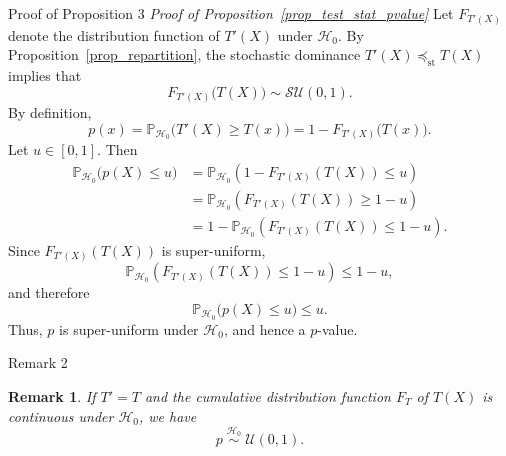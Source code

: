 \documentclass{beamer}
\newtheorem{remark}{Remark}
\begin{document}
\begin{frame}[allowframebreaks]{Proof of Proposition 3}
  \textit{Proof of Proposition~\ref{prop_test_stat_pvalue}}
    Let \(F_{T'(X)}\) denote the distribution function of \(T'(X)\) under $\mathcal{H}_0$.
    By Proposition~\ref{prop_repartition}, the stochastic dominance
    \(T'(X) \preceq_{\mathrm{st}} T(X)\) implies that
    \begin{equation*}
      F_{T'(X)}\bigl(T(X)\bigr) \sim \mathcal{SU}(0,1).
    \end{equation*}
    By definition,
    \begin{equation*}
      p(x) = \mathbb{P}_{\mathcal{H}_0}\!\bigl(T'(X) \ge T(x)\bigr)
           = 1 - F_{T'(X)}\bigl(T(x)\bigr).
    \end{equation*}
    Let \(u \in [0,1]\). Then
    \begin{align*}
      \mathbb{P}_{\mathcal{H}_0}\bigl(p(X) \le u\bigr)
      &= \mathbb{P}_{\mathcal{H}_0}\!\left(1 - F_{T'(X)}(T(X)) \le u\right) \\
      &= \mathbb{P}_{\mathcal{H}_0}\!\left(F_{T'(X)}(T(X)) \ge 1-u\right) \\
      &= 1 - \mathbb{P}_{\mathcal{H}_0}\!\left(F_{T'(X)}(T(X)) \le 1-u\right).
    \end{align*}
    Since \(F_{T'(X)}(T(X))\) is super-uniform,
    \begin{equation*}
      \mathbb{P}_{\mathcal{H}_0}\!\left(F_{T'(X)}(T(X)) \le 1-u\right) \le 1-u,
    \end{equation*}
    and therefore
    \begin{equation*}
      \mathbb{P}_{\mathcal{H}_0}\bigl(p(X) \le u\bigr) \le u.
    \end{equation*}
    Thus, \(p\) is super-uniform under \(\mathcal{H}_0\), and hence a $p$-value.
\end{frame}

\begin{frame}{Remark 2}
  \begin{remark}\label{remark_equal_statistics}
    If \(T' = T\) and the cumulative distribution function \(F_T\) of \(T(X)\) is continuous
    under \(\mathcal{H}_0\), we have
    \begin{equation*}
      p \;\overset{\mathcal{H}_0}{\sim}\; \mathcal{U}(0,1).
    \end{equation*}
  \end{remark}
\end{frame}
\end{document}
